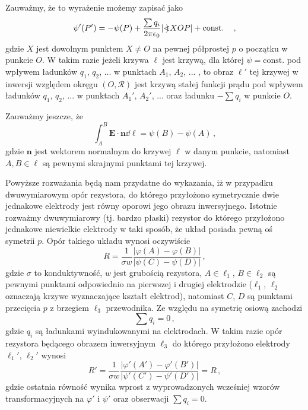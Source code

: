 \documentclass[../main.tex]{subfiles}
\begin{document}
Zauważmy, że to wyrażenie możemy zapisać jako
\begin{equation*}
    \psi'(P')=-\psi(P)+\frac{\sum q_i}{2\pi\epsilon_0}|\mathord{<\mspace{-9mu}\mathrel{)}\mspace{2mu}} XOP|+\text{const.}\quad\,,
\end{equation*}
gdzie \(X\) jest dowolnym punktem \(X\neq O\) na pewnej półprostej \(p\) o początku w punkcie \(O\).
W takim razie jeżeli krzywa \(\ell\) jest krzywą, dla której \(\psi=\text{const.}\) pod wpływem
ładunków \(q_1\), \(q_2\), ... w punktach \(A_1\), \(A_2\), ... , to obraz \(\ell'\) tej krzywej w
inwersji względem okręgu \((O,\mathscr{R})\) jest krzywą stałej funkcji prądu pod wpływem ładunków
\(q_1\), \(q_2\), ... w punktach \(A_1'\), \(A_2'\), ... oraz ładunku \(-\sum q_i\) w punkcie \(O\).
\medskip

Zauważmy jeszcze, że
\begin{equation*}
\int_A^B\mathbf{E}\cdot{\mathbf{n}}\dd{\ell}=\psi(B)-\psi(A)\,,
\end{equation*}
gdzie \(\mathbf{n}\) jest wektorem normalnym do krzywej \(\ell\) w danym punkcie, natomiast
\(A,B\in\ell\) są pewnymi skrajnymi punktami tej krzywej.
\medskip

Powyższe rozważania będą nam przydatne do wykazania, iż w przypadku dwuwymiarowym opór rezystora, do
którego przyłożono symetrycznie dwie jednakowe elektrody jest równy oporowi jego obrazu
inwersyjnego. Istotnie rozważmy dwuwymiarowy (tj. bardzo płaski) rezystor do którego przyłożono
jednakowe niewielkie elektrody w taki sposób, że układ posiada pewną oś symetrii \(p\). Opór takiego
układu wynosi oczywiście
\begin{equation*}
    R=\frac{1}{\sigma w}\frac{|\varphi(A)-\varphi(B)|}{|\psi(C)-\psi(D)|}\,,
\end{equation*}
gdzie \(\sigma\) to konduktywność, \(w\) jest grubością rezystora, \(A\in\ell_1\), \(B\in\ell_2\) są
pewnymi punktami odpowiednio na pierwszej i drugiej elektrodzie (\(\ell_1\), \(\ell_2\) oznaczają
krzywe wyznaczające kształt elektrod), natomiast \(C\), \(D\) są punktami przecięcia \(p\) z
brzegiem \(\ell_3\) przewodnika. Ze względu na symetrię osiową zachodzi
\begin{equation*}
    \sum q_i=0\,,
\end{equation*}
gdzie \(q_i\) są ładunkami wyindukowanymi na elektrodach. W takim razie opór rezystora będącego
obrazem inwersyjnym \(\ell_3\) do którego przyłożono elektrody \(\ell_1'\), \(\ell_2'\) wynosi
\begin{equation*}
    R'=\frac{1}{\sigma w}\frac{|\varphi'(A')-\varphi'(B')|}{|\psi'(C')-\psi'(D')|}=R\,,
\end{equation*}
gdzie ostatnia równość wynika wprost z wyprowadzonych wcześniej wzorów transformacyjnych na
\(\varphi'\) i \(\psi'\) oraz obserwacji \(\sum q_i=0\).
\newpage
\end{document}
